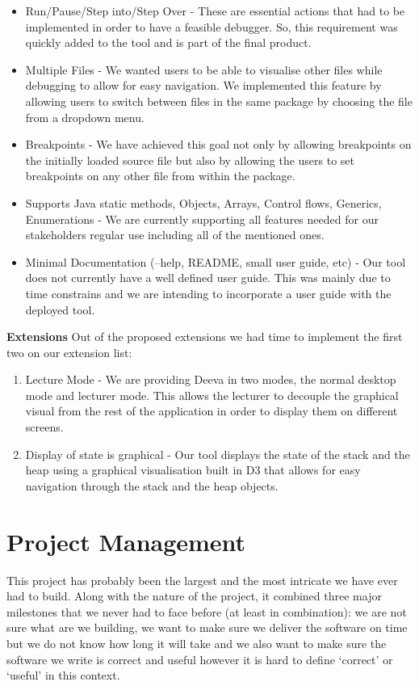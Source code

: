 \documentclass[11pt, a4paper]{article}
\begin{document}
\begin{itemize}
\item Run/Pause/Step into/Step Over - These are essential actions that had to be implemented in order to have a feasible debugger. So, this requirement was quickly added to the tool and is part of the final product.
\item Multiple Files - We wanted users to be able to visualise other files while debugging to allow for easy navigation. We implemented this feature by allowing users to switch between files in the same package by choosing the file from a dropdown menu.
\item Breakpoints - We have achieved this goal not only by allowing breakpoints on the initially loaded source file but also by allowing the users to set breakpoints on any other file from within the package.
\item Supports Java static methods, Objects, Arrays, Control flows, Generics, Enumerations - We are currently supporting all features needed for our stakeholders regular use including all of the mentioned ones.
\item Minimal Documentation (--help, README, small user guide, etc) - Our tool does not currently have a well defined user guide. This was mainly due to time constrains and we are intending to incorporate a user guide with the deployed tool.
\end{itemize}

\textbf{Extensions}
Out of the proposed extensions we had time to implement the first two on our extension list:
\begin{enumerate}
\item Lecture Mode - We are providing Deeva in two modes, the normal desktop mode and lecturer mode. This allows the lecturer to decouple the graphical visual from the rest of the application in order to display them on different screens.
\item Display of state is graphical - Our tool displays the state of the stack and the heap using a graphical visualisation built in D3 that allows for easy navigation through the stack and the heap objects.
\end{enumerate}

\section{Project Management}
This project has probably been the largest and the most intricate we have ever had to build.
Along with the nature of the project, it combined three major milestones that we never had to face before (at least in combination): we are not sure what are we building, we want to make sure we deliver the software on time but we do not know how long it will take and we also want to make sure the software we write is correct and useful however it is hard to define `correct' or `useful' in this context.
\end{document}
